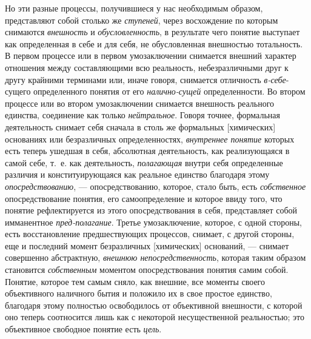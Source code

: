 \documentclass[twoside]{article}
\begin{document}
{{{Но эти разные процессы, получившиеся у нас необходимым
образом, представляют собой столько же
{\em ступеней}, через
восхождение по которым снимаются
{\em внешность} и
{\em обусловленность}, в
результате чего понятие выступает как определенная в себе и для себя, не
обусловленная внешностью тотальность. В первом процессе или в первом
умозаключении снимается внешний характер отношения между составляющими всю
реальность, небезразличными друг к другу крайними терминами или, иначе
говоря, снимается отличность
{\em в-себе}-сущего
определенного понятия от его
{\em налично-сущей}
определенности. Во втором процессе или во втором
умозаключении снимается внешность реального единства, соединение как только
{\em нейтральное}. Говоря
точнее, формальная деятельность снимает себя сначала в столь же формальных
[химических] основаниях или безразличных определенностях,
{\em внутреннее понятие}
которых есть теперь ушедшая в себя, абсолютная деятельность,
как реализующаяся в самой себе, т.~е. как деятельность,
{\em полагающая} внутри
себя определенные различия и конституирующаяся как реальное единство
благодаря этому {\em опосредствованию},
— опосредствованию, которое, стало быть, есть
{\em собственное}
опосредствование понятия, его самоопределение и которое ввиду
того, что понятие рефлектируется из этого опосредствования в себя,
представляет собой имманентное
{\em пред-полагание}.
Третье умозаключение, которое, с одной стороны, есть
восстановление предшествующих процессов, снимает, с другой стороны, еще и
последний момент безразличных [химических] оснований, —
снимает совершенно абстрактную,
{\em внешнюю непосредственность},
которая таким образом становится
{\em собственным}
моментом опосредствования понятия самим собой. Понятие,
которое тем самым сняло, как внешние, все моменты своего объективного
наличного бытия и положило их в свое простое единство, благодаря этому
полностью освободилось от объективной внешности, с которой оно теперь
соотносится лишь как с некоторой несущественной реальностью; это
объективное свободное понятие есть
{\em цель}.

}}}
\end{document}
